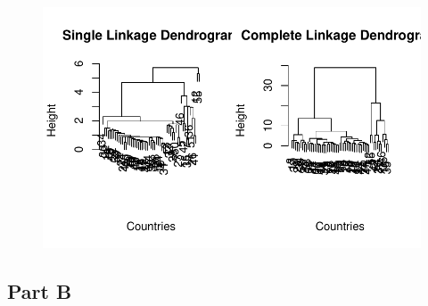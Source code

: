\documentclass[
  letterpaper,
  DIV=11,
  numbers=noendperiod]{scrartcl}
\begin{document}
\begin{figure}[H]

{\centering \includegraphics{CervantesAlvarez_Brian_HW5_ST557_files/figure-pdf/unnamed-chunk-1-1.pdf}

}

\end{figure}

\hypertarget{part-b}{%
\subsection{Part B}\label{part-b}}
\end{document}
